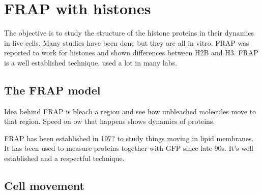 \chapter{FRAP with histones}
\label{ch:frap}


The objective is to study the structure of the histone proteins in their dynamics
in live cells. Many studies have been done but they are all in vitro. FRAP was reported
to work for histones and shown differences between H2B and H3. FRAP is a well established
technique, used a lot in many labs.

\section{The FRAP model}

  Idea behind FRAP is bleach a region and see how unbleached molecules move to that region.
  Speed on ow that happens shows dynamics of proteins.

  FRAP has been established in 197? to study things moving in lipid membranes. It has been
  used to measure proteins together with GFP since late 90s. It's well established and a
  respectful technique.

  

    

\section{Cell movement}

